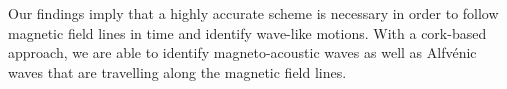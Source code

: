 \documentclass{aa}
\begin{document}
{%
%
}{%
%
Our findings imply that a highly accurate scheme is necessary in order to follow magnetic field lines in time and identify wave-like motions. With a cork-based approach, we are able to identify magneto-acoustic waves as well as Alfv\'enic waves that are travelling along the magnetic field lines.  
%
}%
%


\maketitle
\end{document}
